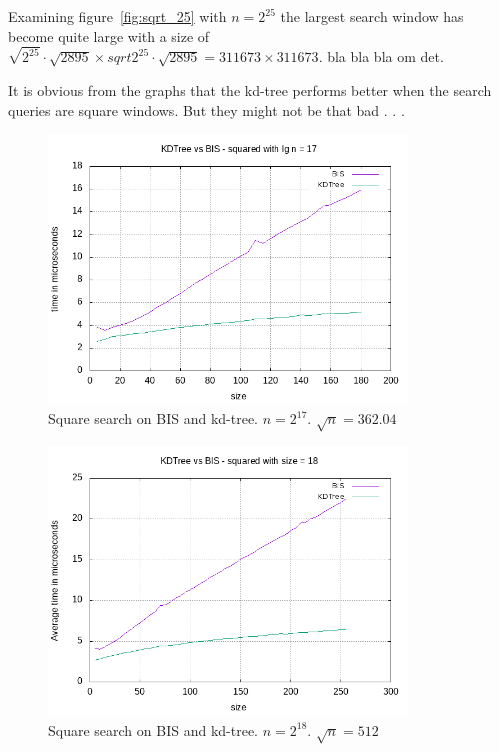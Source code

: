 Examining figure~\ref{fig:sqrt_25} with $n = 2^{25}$ the largest search window has become quite large with a size of $\sqrt{2^{25}}\cdot\sqrt{2895} \times sqrt{2^{25}}\cdot\sqrt{2895} = 311673 \times 311673$. bla bla bla om det.


It is obvious from the graphs that the kd-tree performs better when the search queries are square windows. But they might not be that bad . . . 




\begin{figure}[h]
    \centering
    \includegraphics[width = 0.85\textwidth]{pictures/analysis/sqrt_17.png}
    \caption{Square search on BIS and kd-tree. $n=2^{17}$. $\sqrt{n} = 362.04$}\label{fig:sqrt_17}
\end{figure}


\begin{figure}[h]
    \centering
    \includegraphics[width = 0.85\textwidth]{pictures/analysis/sqrt_18.png}
    \caption{Square search on BIS and kd-tree. $n=2^{18}$. $\sqrt{n} = 512$}\label{fig:sqrt_18}
\end{figure}

